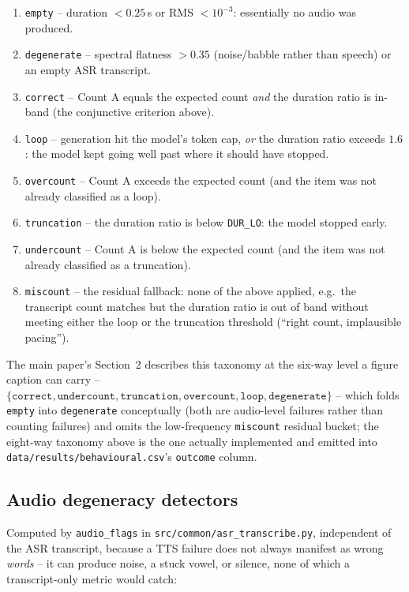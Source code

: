 \documentclass[11pt]{article}
\begin{document}
\begin{enumerate}
\item \texttt{empty} -- duration $<0.25\,$s or RMS $<10^{-3}$: essentially no
  audio was produced.
\item \texttt{degenerate} -- spectral flatness $>0.35$ (noise/babble rather
  than speech) or an empty ASR transcript.
\item \texttt{correct} -- Count A equals the expected count \emph{and} the
  duration ratio is in-band (the conjunctive criterion above).
\item \texttt{loop} -- generation hit the model's token cap, \emph{or} the
  duration ratio exceeds $1.6$: the model kept going well past where it
  should have stopped.
\item \texttt{overcount} -- Count A exceeds the expected count (and the item
  was not already classified as a loop).
\item \texttt{truncation} -- the duration ratio is below \texttt{DUR\_LO}:
  the model stopped early.
\item \texttt{undercount} -- Count A is below the expected count (and the
  item was not already classified as a truncation).
\item \texttt{miscount} -- the residual fallback: none of the above applied,
  e.g.\ the transcript count matches but the duration ratio is out of band
  without meeting either the loop or the truncation threshold (``right count,
  implausible pacing'').
\end{enumerate}

The main paper's Section~2 describes this taxonomy at the six-way level a
figure caption can carry --
$\{\texttt{correct}, \texttt{undercount}, \texttt{truncation},
\texttt{overcount}, \texttt{loop}, \texttt{degenerate}\}$ -- which folds
\texttt{empty} into \texttt{degenerate} conceptually (both are audio-level
failures rather than counting failures) and omits the low-frequency
\texttt{miscount} residual bucket; the eight-way taxonomy above is the one
actually implemented and emitted into \texttt{data/results/behavioural.csv}'s
\texttt{outcome} column.

\subsection{Audio degeneracy detectors}

Computed by \texttt{audio\_flags} in \texttt{src/common/asr\_transcribe.py},
independent of the ASR transcript, because a TTS failure does not always
manifest as wrong \emph{words} -- it can produce noise, a stuck vowel, or
silence, none of which a transcript-only metric would catch:
\end{document}
